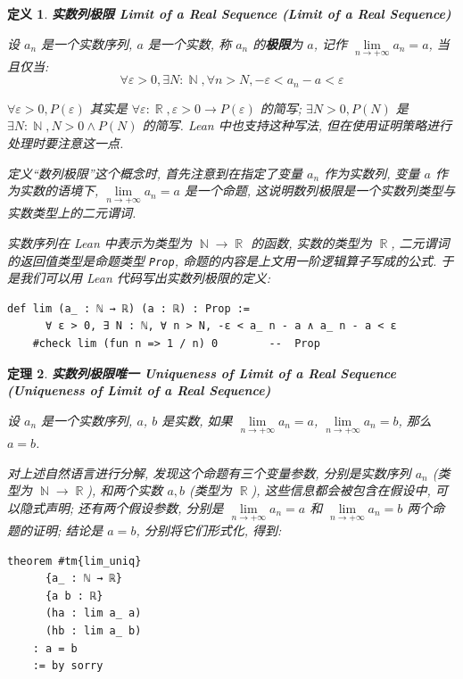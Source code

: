 \documentclass[UTF8]{ctexart}
\DeclareMathOperator{\N}{\mathbb{N}}                    %
\DeclareMathOperator{\R}{\mathbb{R}}                    %
\DeclareMathOperator{\0}{\mathbf{0}}                    %
\newcommand{\<}{\langle}
\renewcommand{\>}{\rangle}                              %
\newenvironment{dfn_box}{
    \begin{tcolorbox}[enhanced, colback=dfn_green2, boxrule=0pt, frame hidden,
        borderline west={0.7mm}{0.1mm}{dfn_green1},breakable]
    }
    {\end{tcolorbox}}
\newenvironment{thm_box}{
    \begin{tcolorbox}[enhanced, colback=thm_blue2, boxrule=0pt, frame hidden,
        borderline west={0.7mm}{0.1mm}{thm_blue1},breakable]
    }
    {\end{tcolorbox}}
\theoremstyle{MyStyle} %
\newtheorem{definition}{定义}[subsection]
\newenvironment{dfn}[2]
{
    \begin{dfn_box}
        \begin{definition}
            \textbf{#1
                \ifx\relax#2\relax\else %
                    (#2) %
                \fi}
            \newline
}
{
        \end{definition}
    \end{dfn_box}
}
\newtheorem{theorem}[definition]{定理}
\newenvironment{thm}[2]
{
    \begin{thm_box}
        \begin{theorem}
            \textbf{#1
                \ifx\relax#2\relax\else %
                    (#2) %
                \fi}
            \newline
}
{
        \end{theorem}
    \end{thm_box}
}
\newcommand*{\lean}[1]{\texttt{\color{blue}#1}}
\begin{document}
        \begin{dfn}
            {实数列极限}
            {Limit of a Real Sequence}
            设 \(a_n\) 是一个实数序列, \(a\) 是一个实数, 称 \(a_n\) 的\textbf{极限}为 \(a\), 记作 \(\lim\limits_{n\to+\infty} a_n = a\), 当且仅当:  
            \[\forall\varepsilon>0, \exists N:\N, \forall n>N, -\varepsilon<a_n-a<\varepsilon\]
            
            $\forall\varepsilon>0, P(\varepsilon)$ 其实是 $\forall\varepsilon:\R, \varepsilon>0\to P(\varepsilon)$ 的简写; $\exists N>0, P(N)$ 是 $\exists N : \N, N>0\land P(N)$ 的简写. Lean 中也支持这种写法, 但在使用证明策略进行处理时要注意这一点. 
            
            定义``数列极限''这个概念时, 首先注意到在指定了变量 $a_n$ 作为实数列, 变量 $a$ 作为实数的语境下, $\lim\limits_{n\to+\infty}a_n = a$ 是一个命题, 这说明数列极限是一个实数列类型与实数类型上的二元谓词. 
            
            实数序列在 Lean 中表示为类型为 $\N\to\R$ 的函数, 实数的类型为 $\R$, 二元谓词的返回值类型是命题类型 \lean{Prop}, 命题的内容是上文用一阶逻辑算子写成的公式. 于是我们可以用 Lean 代码写出实数列极限的定义: 
            \begin{lstlisting}[style=lean]
    def lim (a_ : ℕ → ℝ) (a : ℝ) : Prop :=
      ∀ ε > 0, ∃ N : ℕ, ∀ n > N, -ε < a_ n - a ∧ a_ n - a < ε
    #check lim (fun n => 1 / n) 0        --  Prop
            \end{lstlisting}
        \end{dfn}

        \begin{thm}
            {实数列极限唯一}
            {Uniqueness of Limit of a Real Sequence}
            设 $a_n$ 是一个实数序列, $a$, $b$ 是实数, 如果 \(\lim\limits_{n\to+\infty} a_n = a\), \(\lim\limits_{n\to+\infty} a_n = b\), 那么 $a=b$. 

            对上述自然语言进行分解, 发现这个命题有三个变量参数, 分别是实数序列 $a_n$ (类型为 $\N\to\R$), 和两个实数 $a,b$ (类型为 $\R$), 这些信息都会被包含在假设中, 可以隐式声明; 还有两个假设参数, 分别是 $\lim\limits_{n\to+\infty} a_n = a$ 和 $\lim\limits_{n\to+\infty} a_n = b$ 两个命题的证明; 结论是 $a=b$, 分别将它们形式化, 得到: 
            \begin{lstlisting}[style=lean]
    theorem #tm{lim_uniq}
      {a_ : ℕ → ℝ}
      {a b : ℝ}
      (ha : lim a_ a)
      (hb : lim a_ b)
    : a = b
    := by sorry
            \end{lstlisting}
        \end{thm}
\end{document}
